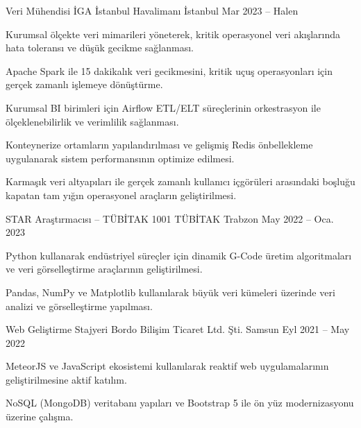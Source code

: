 
\begin{cventries}

\cventry
  {Veri Mühendisi}
  {İGA İstanbul Havalimanı}
  {İstanbul}
  {Mar 2023 – Halen}
  {
    \begin{cvitems}
      \item {Kurumsal ölçekte veri mimarileri yöneterek, kritik operasyonel veri akışlarında hata toleransı ve düşük gecikme sağlanması.}
      \item {Apache Spark ile 15 dakikalık veri gecikmesini, kritik uçuş operasyonları için gerçek zamanlı işlemeye dönüştürme.}
      \item {Kurumsal BI birimleri için Airflow ETL/ELT süreçlerinin orkestrasyon ile ölçeklenebilirlik ve verimlilik sağlanması.}
      \item {Konteynerize ortamların yapılandırılması ve gelişmiş Redis önbellekleme uygulanarak sistem performansının optimize edilmesi.}
      \item {Karmaşık veri altyapıları ile gerçek zamanlı kullanıcı içgörüleri arasındaki boşluğu kapatan tam yığın operasyonel araçların geliştirilmesi.}
    \end{cvitems}
  }
  \cventry
    {STAR Araştırmacısı – TÜBİTAK 1001}
    {TÜBİTAK}
    {Trabzon}
    {May 2022 – Oca. 2023}
    {
      \begin{cvitems}
        \item {Python kullanarak endüstriyel süreçler için dinamik G-Code üretim algoritmaları ve veri görselleştirme araçlarının geliştirilmesi.}
        \item {Pandas, NumPy ve Matplotlib kullanılarak büyük veri kümeleri üzerinde veri analizi ve görselleştirme yapılması.}
      \end{cvitems}
    }

  \cventry
    {Web Geliştirme Stajyeri}
    {Bordo Bilişim Ticaret Ltd. Şti.}
    {Samsun}
    {Eyl 2021 – May 2022}
    {
      \begin{cvitems}
        \item {MeteorJS ve JavaScript ekosistemi kullanılarak reaktif web uygulamalarının geliştirilmesine aktif katılım.}
        \item {NoSQL (MongoDB) veritabanı yapıları ve Bootstrap 5 ile ön yüz modernizasyonu üzerine çalışma.}
      \end{cvitems}
    }

\end{cventries}
